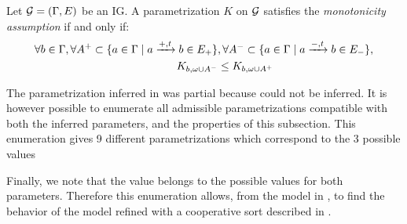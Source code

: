 \begin{property}
\label{pro:param_enum_monotonicity}
Let $\mathcal{G} = (\Gamma, E)$ be an IG. A parametrization $K$ on $\mathcal{G}$ satisfies the \emph{monotonicity assumption} if and only if:
\begin{align*}
  \forall b \in \Gamma,
  \forall A^+ \subset \{ a \in \Gamma \mid a \xrightarrow{+, t} b \in E_+ \}&,
  \forall A^- \subset \{ a \in \Gamma \mid a \xrightarrow{-, t} b \in E_- \},\\
  K_{b,\omega \cup A^-} & \leq K_{b,\omega \cup A^+}
\end{align*}
\end{property}

\begin{example}\label{ex:enum-param-runningPH-1}
The parametrization inferred in  was partial
because  could not be inferred.
It is however possible to enumerate all admissible parametrizations
compatible with both the inferred parameters, and the properties of this subsection.
This enumeration gives 9 different parametrizations
which correspond to the 3 possible values

Finally, we note that the value  belongs to the possible values for both parameters.
Therefore this enumeration allows, from the model in ,
to find the behavior of the model refined with a cooperative sort described in
.
\end{example}
